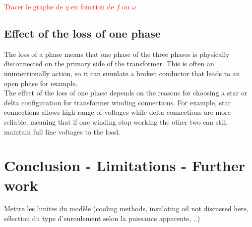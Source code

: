 \documentclass[12pt,a4paper]{report}
\begin{document}
\textcolor{red}{Tracer le graphe de $\eta$ en fonction de $f$ ou $\omega$}

\subsection{Effect of the loss of one phase}
The loss of a phase means that one phase of the three phases is physically disconnected on the primary side of the transformer. This is often an unintentionally action, so it can simulate a broken conductor that leads to an open phase for example.\\

The effect of the loss of one phase depends on the reasons for choosing a star or delta configuration for transformer winding connections. For example, star connections allows high range of voltages while delta connections are more reliable, meaning that if one winding stop working the other two can still maintain full line voltages to the load.

\section{Conclusion - Limitations - Further work}
Mettre les limites du modèle (cooling methods, insulating oil not discussed here, sélection du type d'enroulement selon la puissance apparente, ..)
\end{document}
